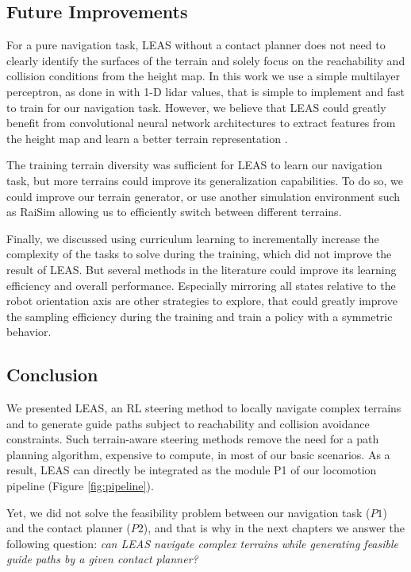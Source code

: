 \subsection{Future Improvements}

For a pure navigation task, LEAS without a contact planner does not need to clearly identify the surfaces of the terrain and solely focus on the reachability and collision conditions from the height map.
In this work we use a simple multilayer perceptron, as done in \cite{RL_RRT, RL_RRT_AUTORL} with 1-D lidar values, that is simple to implement and fast to train for our navigation task. 
However, we believe that LEAS could greatly benefit from convolutional neural network architectures to extract features from the height map and learn a better terrain representation \cite{deepLoco,deepGait,RLOC}.

The training terrain diversity was sufficient for LEAS to learn our navigation task, but more terrains could improve its generalization capabilities.
To do so, we could improve our terrain generator, or use another simulation environment such as RaiSim \cite{raisim} allowing us to efficiently switch between different terrains.

Finally, we discussed using curriculum learning \cite{curriculum_learning_survey} to incrementally increase the complexity of the tasks to solve during the training, which did not improve the result of LEAS. But several methods in the literature could improve its learning efficiency and overall performance.
Especially mirroring all states relative to the robot orientation axis are other strategies to explore, that could greatly improve the sampling efficiency during the training and train a policy with a symmetric behavior.


\subsection{Conclusion}
We presented LEAS, an RL steering method to locally navigate complex terrains and to generate guide paths subject to reachability and collision avoidance constraints. 
Such terrain-aware steering methods remove the need for a path planning algorithm, expensive to compute, in most of our basic scenarios.
As a result, LEAS can directly be integrated as the module P1 of our locomotion pipeline (Figure \ref{fig:pipeline}).

Yet, we did not solve the feasibility problem between our navigation task ($P1$) and the contact planner ($P2$), and that is why in the next chapters we answer the following question: 
\textit{can LEAS navigate complex terrains while generating feasible guide paths by a given contact planner?}